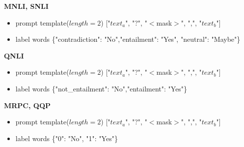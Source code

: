 \documentclass{article} \usepackage{iclr2022_conference,times}
\begin{document}
\textbf{MNLI, SNLI}
\begin{itemize}
\item prompt template($length=2$)
["$text_a$", "?", "$<$mask$>$", ",", "$text_b$"]
\item label words
\{"contradiction": "No","entailment": "Yes", "neutral": "Maybe"\}
\end{itemize}

\textbf{QNLI}
\begin{itemize}
\item prompt template($length=2$)
["$text_a$", "?", "$<$mask$>$", ",", "$text_b$"]
\item label words
\{"not\_entailment": "No","entailment": "Yes"\}
\end{itemize}

\textbf{MRPC, QQP}
\begin{itemize}
\item prompt template($length=2$)
["$text_a$", "?", "$<$mask$>$", ",", "$text_b$"]
\item label words
\{"0": "No", "1": "Yes"\}
\end{itemize}
\end{document}
